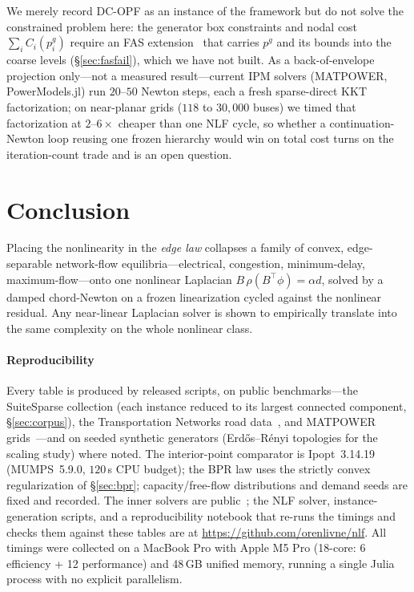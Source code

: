 \documentclass{siamart220329}
\begin{document}
We merely record DC-OPF as an instance of the framework but do not solve the constrained problem here: the
generator box constraints and nodal cost $\sum_i C_i(p^g_i)$ require an FAS extension~\cite{brandt-fas}
that carries $p^g$ and its bounds into the coarse levels (\S\ref{sec:fasfail}), which we have not built.
As a back-of-envelope projection only---not a measured result---current IPM solvers (MATPOWER,
PowerModels.jl) run $20$--$50$ Newton steps, each a fresh sparse-direct KKT factorization; on
near-planar grids ($118$ to $30{,}000$ buses) we timed that factorization at $2$--$6\times$ cheaper than one
NLF cycle, so whether a continuation-Newton loop reusing one frozen hierarchy would win on total cost
turns on the iteration-count trade and is an open question.

\section{Conclusion}\label{sec:conclusion}
Placing the nonlinearity in the \emph{edge law} collapses a family of convex, edge-separable
network-flow equilibria---electrical, congestion, minimum-delay, maximum-flow---onto one nonlinear
Laplacian $B\,\rho(B^{\top}\phi)=\alpha d$, solved by a damped chord-Newton on a frozen linearization
cycled against the nonlinear residual. Any
near-linear Laplacian solver is shown to empirically translate into the same complexity on the whole nonlinear class.

\paragraph{Reproducibility} Every table is produced by released scripts, on public benchmarks---the
SuiteSparse collection (each instance reduced to its largest connected component, \S\ref{sec:corpus}),
the Transportation Networks road data~\cite{tntp}, and MATPOWER grids~\cite{matpower}---and on
seeded synthetic generators (Erd\H{o}s--R\'enyi topologies for the scaling study) where noted. The interior-point
comparator is Ipopt~3.14.19 (MUMPS~5.9.0, $120$\,s CPU budget); the BPR law uses the strictly convex
regularization of \S\ref{sec:bpr}; capacity/free-flow distributions and demand seeds are fixed and
recorded. The inner solvers are public~\cite{approxchol,lamgplus}; the NLF solver, instance-generation
scripts, and a reproducibility notebook that re-runs the timings and checks them against these tables
are at \url{https://github.com/orenlivne/nlf}. All timings were collected on a MacBook Pro with Apple M5 Pro (18-core: 6 efficiency + 12 performance) and 48\,GB unified memory, running a single Julia process with no explicit parallelism.
\end{document}
